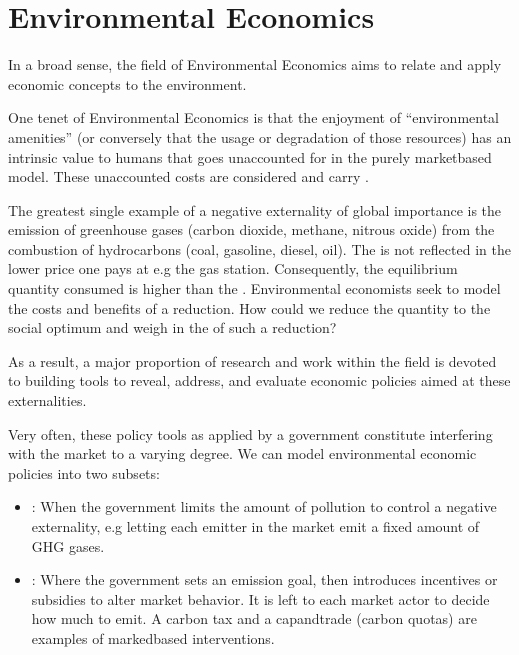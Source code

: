 \documentclass[letterpaper,10pt,english]{jupyterBook}
\begin{document}
\section{Environmental Economics}
\label{\detokenize{content/12-environmental/index:environmental-economics}}\label{\detokenize{content/12-environmental/index::doc}}
\sphinxAtStartPar
{}

\sphinxAtStartPar
In a broad sense, the field of Environmental Economics aims to relate and apply economic concepts to the environment.

\sphinxAtStartPar
One tenet of Environmental Economics is that the enjoyment of “environmental amenities”   (or conversely that the usage or degradation  of those resources) has an intrinsic value to humans that goes unaccounted for in the purely market\sphinxhyphen{}based model. These unaccounted costs are considered  and carry .

\sphinxAtStartPar
The greatest single example of a negative externality of global importance is the emission of greenhouse gases (carbon dioxide, methane, nitrous oxide) from the combustion of hydrocarbons (coal, gasoline, diesel, oil). The   is not reflected in the lower price one pays at e.g the gas station. Consequently, the equilibrium quantity consumed is higher than the . Environmental economists seek to model the costs and benefits of a reduction.  How could we reduce the quantity to the social optimum and weigh in the  of such a reduction?

\sphinxAtStartPar
As a result, a major proportion of research and work within the field is devoted to building tools to reveal, address, and evaluate economic policies aimed at  these externalities.

\sphinxAtStartPar
Very often, these policy tools as applied by a government constitute interfering with the market to a varying degree. We can model environmental economic policies into two subsets:
\begin{itemize}
\item {} 
\sphinxAtStartPar
{}: When the government limits the amount of pollution to control a negative externality, e.g letting each emitter in the market emit a fixed amount of GHG gases.

\item {} 
\sphinxAtStartPar
{}: Where the government sets an emission goal, then introduces incentives or subsidies to alter market behavior. It is left to each market actor to decide how much to emit. A carbon tax and a cap\sphinxhyphen{}and\sphinxhyphen{}trade (carbon quotas) are examples of marked\sphinxhyphen{}based interventions.

\end{itemize}
\end{document}
